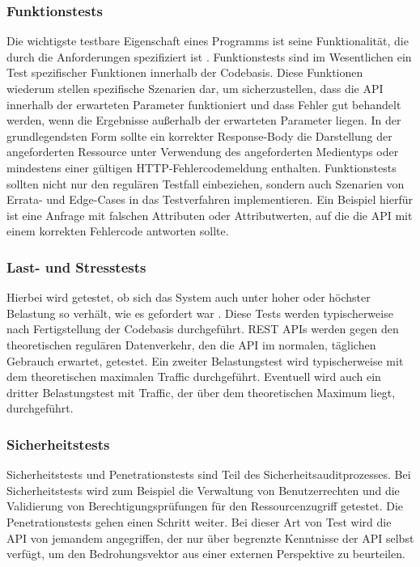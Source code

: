 \subsubsection{Funktionstests}
Die wichtigste testbare Eigenschaft eines Programms ist seine Funktionalität, die durch die Anforderungen spezifiziert ist \parencite[457]{ludewig2007software}. Funktionstests sind im Wesentlichen ein Test spezifischer Funktionen innerhalb der Codebasis. Diese Funktionen wiederum stellen spezifische Szenarien dar, um sicherzustellen, dass die API innerhalb der erwarteten Parameter funktioniert und dass Fehler gut behandelt werden, wenn die Ergebnisse außerhalb der erwarteten Parameter liegen. In der grundlegendsten Form sollte ein korrekter Response-Body die Darstellung der angeforderten Ressource unter Verwendung des angeforderten Medientyps oder mindestens einer gültigen HTTP-Fehlercodemeldung enthalten. Funktionstests sollten nicht nur den regulären Testfall einbeziehen, sondern auch Szenarien von Errata- und Edge-Cases in das Testverfahren implementieren. Ein Beispiel hierfür ist eine Anfrage mit falschen Attributen oder Attributwerten, auf die die API mit einem korrekten Fehlercode antworten sollte.

\subsubsection{Last- und Stresstests}
Hierbei wird getestet, ob sich das System auch unter hoher oder höchster Belastung so verhält, wie es gefordert war \parencite[458]{ludewig2007software}. Diese Tests werden typischerweise nach Fertigstellung der Codebasis durchgeführt. REST APIs werden gegen den theoretischen regulären Datenverkehr, den die API im normalen, täglichen Gebrauch erwartet, getestet. Ein zweiter Belastungstest wird typischerweise mit dem theoretischen maximalen Traffic durchgeführt. Eventuell wird auch ein dritter Belastungstest mit Traffic, der über dem theoretischen Maximum liegt, durchgeführt.

\subsubsection{Sicherheitstests}
Sicherheitstests und Penetrationstests sind Teil des Sicherheitsauditprozesses. Bei Sicherheitstests wird zum Beispiel die Verwaltung von Benutzerrechten und die Validierung von Berechtigungsprüfungen für den Ressourcenzugriff getestet. Die Penetrationstests gehen einen Schritt weiter. Bei dieser Art von Test wird die API von jemandem angegriffen, der nur über begrenzte Kenntnisse der API selbst verfügt, um den Bedrohungsvektor aus einer externen Perspektive zu beurteilen.

